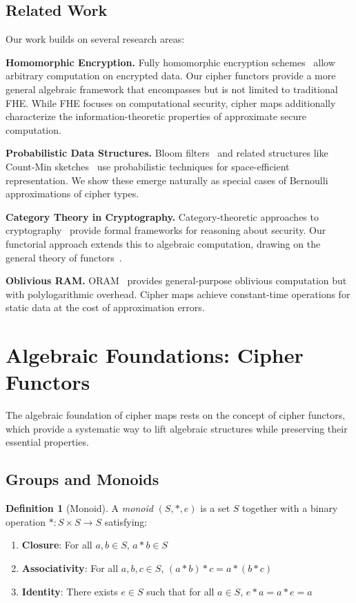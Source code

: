 \documentclass[11pt]{article}
\theoremstyle{definition}
\newtheorem{definition}{Definition}[section]
\theoremstyle{plain}
\theoremstyle{remark}
\begin{document}
\subsection{Related Work}

Our work builds on several research areas:

\textbf{Homomorphic Encryption.}
Fully homomorphic encryption schemes~\cite{gentry2009fully} allow arbitrary computation on encrypted data. Our cipher functors provide a more general algebraic framework that encompasses but is not limited to traditional FHE. While FHE focuses on computational security, cipher maps additionally characterize the information-theoretic properties of approximate secure computation.

\textbf{Probabilistic Data Structures.}
Bloom filters~\cite{bloom1970space} and related structures like Count-Min sketches~\cite{cormode2005improved} use probabilistic techniques for space-efficient representation. We show these emerge naturally as special cases of Bernoulli approximations of cipher types.

\textbf{Category Theory in Cryptography.}
Category-theoretic approaches to cryptography~\cite{barthe2009formal} provide formal frameworks for reasoning about security. Our functorial approach extends this to algebraic computation, drawing on the general theory of functors~\cite{mac2003categories}.

\textbf{Oblivious RAM.}
ORAM~\cite{goldreich1996software} provides general-purpose oblivious computation but with polylogarithmic overhead. Cipher maps achieve constant-time operations for static data at the cost of approximation errors.

\section{Algebraic Foundations: Cipher Functors}
\label{sec:algebraic}

The algebraic foundation of cipher maps rests on the concept of cipher functors, which provide a systematic way to lift algebraic structures while preserving their essential properties.

\subsection{Groups and Monoids}

\begin{definition}[Monoid]
\label{def:monoid}
A \emph{monoid} $(S, *, e)$ is a set $S$ together with a binary operation $* : S \times S \to S$ satisfying:
\begin{enumerate}
\item \textbf{Closure}: For all $a,b \in S$, $a*b \in S$
\item \textbf{Associativity}: For all $a,b,c \in S$, $(a*b)*c = a*(b*c)$
\item \textbf{Identity}: There exists $e \in S$ such that for all $a \in S$, $e*a = a*e = a$
\end{enumerate}
\end{definition}
\end{document}
